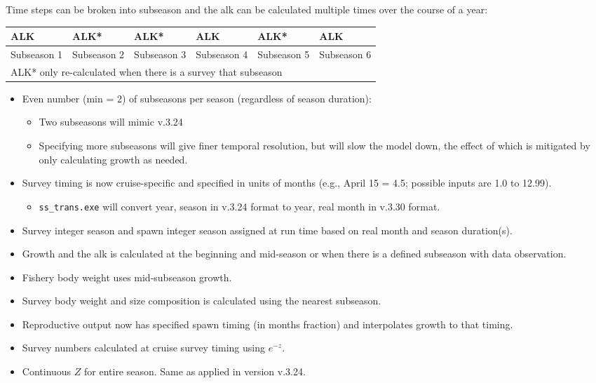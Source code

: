 Time steps can be broken into subseason and the \gls{alk} can be calculated multiple times over the course of a year:
\vspace*{-\baselineskip}
\begin{center}
	\begin{tabular}{|p{2.37cm}|p{2.37cm}|p{2.37cm}|p{2.37cm}|p{2.37cm}|p{2.37cm}|}
		\hline
		ALK & ALK* & ALK* & ALK & ALK* & ALK \Tstrut\Bstrut\\
		\hline
		Subseason 1 & Subseason 2 & Subseason 3 & Subseason 4 & Subseason 5 & Subseason 6 \Tstrut\Bstrut\\		
		\hline
		\multicolumn{6}{l}{ALK* only re-calculated when there is a survey that subseason} \Tstrut\Bstrut\\			
	\end{tabular}
	\leavevmode\tagmcend\tagstructend\par
\end{center}

	\begin{itemize}
		\item Even number (min = 2) of subseasons per season (regardless of season duration):
			\begin{itemize}
				\item Two subseasons will mimic v.3.24
				\item Specifying more subseasons will give finer temporal resolution, but will slow the model down, the effect of which is mitigated by only calculating growth as needed.
			\end{itemize}
		\item Survey timing is now cruise-specific and specified in units of months (e.g., April 15 = 4.5; possible inputs are 1.0 to 12.99).
			\begin{itemize}
				\item \texttt{ss\_trans.exe} will convert year, season in v.3.24 format to year, real month in v.3.30 format.
			\end{itemize}
		\item Survey integer season and spawn integer season assigned at run time based on real month and season duration(s).
		\item Growth and the \gls{alk} is calculated at the beginning and mid-season or when there is a defined subseason with data observation.
		\item Fishery body weight uses mid-subseason growth.
		\item Survey body weight and size composition is calculated using the nearest subseason.
		\item Reproductive output now has specified spawn timing (in months fraction) and interpolates growth to that timing.
		\item Survey numbers calculated at cruise survey timing using $e^{-z}$.
		\item Continuous $Z$ for entire season. Same as applied in version v.3.24.
	\end{itemize}

